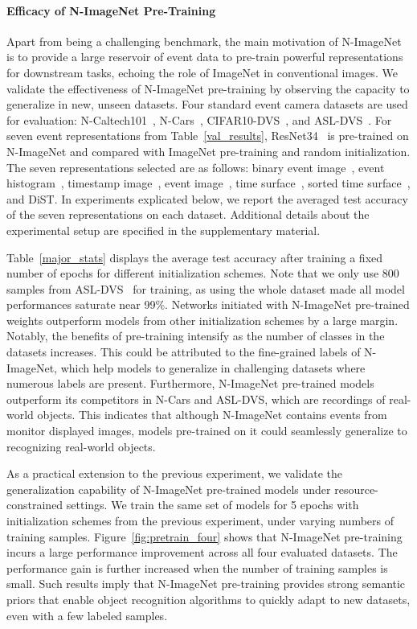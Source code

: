 \paragraph{Efficacy of N-ImageNet Pre-Training}
\label{pre-training}
Apart from being a challenging benchmark, the main motivation of N-ImageNet is to provide a large reservoir of event data to pre-train powerful representations for downstream tasks, echoing the role of ImageNet in conventional images.
We validate the effectiveness of N-ImageNet pre-training by observing the capacity to generalize in new, unseen datasets.
Four standard event camera datasets are used for evaluation: N-Caltech101~\cite{n_caltech}, N-Cars~\cite{hats}, CIFAR10-DVS~\cite{cifar_dvs}, and ASL-DVS~\cite{asl_dvs}.
For seven event representations from Table~\ref{val_results}, ResNet34~\cite{resnet} is pre-trained on N-ImageNet and compared with ImageNet pre-training and random initialization.
The seven representations selected are as follows: binary event image~\cite{binary_image_2}, event histogram~\cite{event_driving}, timestamp image~\cite{timestamp_image}, event image~\cite{ev_gait}, time surface~\cite{hots}, sorted time surface~\cite{ace}, and DiST.
In experiments explicated below, we report the averaged test accuracy of the seven representations on each dataset.
Additional details about the experimental setup are specified in the supplementary material.

Table~\ref{major_stats} displays the average test accuracy after training a fixed number of epochs for different initialization schemes.
Note that we only use 800 samples from ASL-DVS~\cite{asl_dvs} for training, as using the whole dataset made all model performances saturate near 99\%.
Networks initiated with N-ImageNet pre-trained weights outperform models from other initialization schemes by a large margin.
Notably, the benefits of pre-training intensify as the number of classes in the datasets increases.
This could be attributed to the fine-grained labels of N-ImageNet, which help models to generalize in challenging datasets where numerous labels are present.
Furthermore, N-ImageNet pre-trained models outperform its competitors in N-Cars and ASL-DVS, which are recordings of real-world objects.
This indicates that although N-ImageNet contains events from monitor displayed images, models pre-trained on it could seamlessly generalize to recognizing real-world objects.

As a practical extension to the previous experiment, we validate the generalization capability of N-ImageNet pre-trained models under resource-constrained settings.
We train the same set of models for 5 epochs with initialization schemes from the previous experiment, under varying numbers of training samples.
Figure~\ref{fig:pretrain_four} shows that N-ImageNet pre-training incurs a large performance improvement across all four evaluated datasets.
The performance gain is further increased when the number of training samples is small.
Such results imply that N-ImageNet pre-training provides strong semantic priors that enable object recognition algorithms to quickly adapt to new datasets, even with a few labeled samples.

